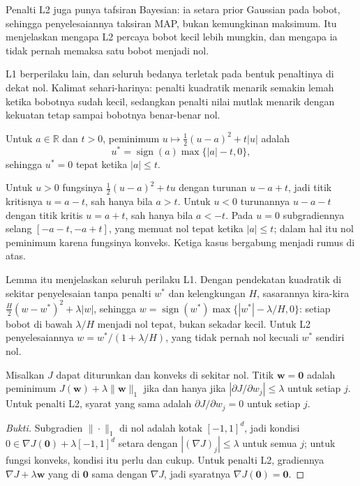 Penalti L2 juga punya tafsiran Bayesian: ia setara prior Gaussian pada bobot, sehingga
penyelesaiannya taksiran MAP, bukan kemungkinan maksimum. Itu menjelaskan mengapa L2
percaya bobot kecil lebih mungkin, dan mengapa ia tidak pernah memaksa satu bobot menjadi
nol.

L1 berperilaku lain, dan seluruh bedanya terletak pada bentuk penaltinya di dekat nol.
Kalimat sehari-harinya: penalti kuadratik menarik semakin lemah ketika bobotnya sudah
kecil, sedangkan penalti nilai mutlak menarik dengan kekuatan tetap sampai bobotnya
benar-benar nol.

\begin{lemma}
Untuk $a\in\mathbb{R}$ dan $t>0$, peminimum $u\mapsto\frac12(u-a)^2+t|u|$ adalah
\[
u^\ast=\operatorname{sign}(a)\max\{|a|-t,0\},
\]
sehingga $u^\ast=0$ tepat ketika $|a|\le t$.
\end{lemma}

Untuk $u>0$ fungsinya $\frac12(u-a)^2+tu$ dengan turunan $u-a+t$, jadi titik
kritisnya $u=a-t$, sah hanya bila $a>t$. Untuk $u<0$ turunannya $u-a-t$ dengan titik
kritis $u=a+t$, sah hanya bila $a<-t$. Pada $u=0$ subgradiennya selang $[-a-t,-a+t]$,
yang memuat nol tepat ketika $|a|\le t$; dalam hal itu nol peminimum karena fungsinya
konveks. Ketiga kasus bergabung menjadi rumus di atas.

Lemma itu menjelaskan seluruh perilaku L1. Dengan pendekatan kuadratik di sekitar
penyelesaian tanpa penalti $w^\ast$ dan kelengkungan $H$, sasarannya kira-kira
$\frac H2(w-w^\ast)^2+\lambda|w|$, sehingga
$w=\operatorname{sign}(w^\ast)\max\{|w^\ast|-\lambda/H,0\}$: setiap bobot di bawah
$\lambda/H$ menjadi nol tepat, bukan sekadar kecil. Untuk L2 penyelesaiannya
$w=w^\ast/(1+\lambda/H)$, yang tidak pernah nol kecuali $w^\ast$ sendiri nol.

\begin{proposisi}
Misalkan $J$ dapat diturunkan dan konveks di sekitar nol. Titik $\mathbf{w}=\mathbf{0}$
adalah peminimum $J(\mathbf{w})+\lambda\|\mathbf{w}\|_1$ jika dan hanya jika
$|\partial J/\partial w_j|\le\lambda$ untuk setiap $j$. Untuk penalti L2, syarat yang
sama adalah $\partial J/\partial w_j=0$ untuk setiap $j$.
\end{proposisi}

\begin{proof}[Bukti]
Subgradien $\|\cdot\|_1$ di nol adalah kotak $[-1,1]^d$, jadi kondisi
$0\in\nabla J(\mathbf{0})+\lambda[-1,1]^d$ setara dengan $|(\nabla J)_j|\le\lambda$
untuk semua $j$; untuk fungsi konveks, kondisi itu perlu dan cukup. Untuk penalti L2,
gradiennya $\nabla J+\lambda\mathbf{w}$ yang di $\mathbf{0}$ sama dengan $\nabla J$, jadi
syaratnya $\nabla J(\mathbf{0})=\mathbf{0}$.
\end{proof}

